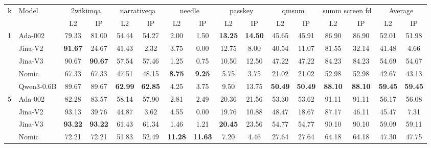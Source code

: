 \begin{sidewaystable}[htbp!]
\centering
\footnotesize
{}
\label{tab:detailed_mrr}
\begin{tabular}{llcccccccccccccc}
\toprule
\multirow{2}{*}{k} & \multirow{2}{*}{Model} & \multicolumn{2}{c}{2wikimqa} & \multicolumn{2}{c}{narrativeqa} & \multicolumn{2}{c}{needle} & \multicolumn{2}{c}{passkey} & \multicolumn{2}{c}{qmsum} & \multicolumn{2}{c}{summ screen fd} & \multicolumn{2}{c}{Average} \\
\cmidrule(lr){3-4} \cmidrule(lr){5-6} \cmidrule(lr){7-8} \cmidrule(lr){9-10} \cmidrule(lr){11-12} \cmidrule(lr){13-14} \cmidrule(lr){15-16}
& & L2 & IP & L2 & IP & L2 & IP & L2 & IP & L2 & IP & L2 & IP & L2 & IP \\
\midrule
\multirow{5}{*}{1} & Ada-002 & 79.33 & 81.00 & 54.44 & 54.27 & 2.00 & 1.50 & \textbf{13.25} & \textbf{14.50} & 45.65 & 45.91 & 86.90 & 86.90 & 52.01 & 51.98 \\
& Jina-V2 & \textbf{91.67} & 24.67 & 41.43 & 2.32 & 3.75 & 0.00 & 12.75 & 8.00 & 40.54 & 11.07 & 81.55 & 32.14 & 41.48 & 4.66 \\
& Jina-V3 & 90.67 & \textbf{90.67} & 57.54 & 57.46 & 1.25 & 0.75 & 10.50 & 12.50 & 47.22 & 47.22 & 84.23 & 84.23 & 54.69 & 54.67 \\
& Nomic & 67.33 & 67.33 & 47.51 & 48.15 & \textbf{8.75} & \textbf{9.25} & 5.75 & 3.75 & 21.02 & 21.02 & 52.98 & 52.98 & 42.67 & 43.13 \\
& Qwen3-0.6B & 89.67 & 89.67 & \textbf{62.99} & \textbf{62.85} & 4.25 & 3.75 & 9.50 & 13.75 & \textbf{50.49} & \textbf{50.49} & \textbf{88.10} & \textbf{88.10} & \textbf{59.45} & \textbf{59.45} \\
\midrule
\multirow{5}{*}{5} & Ada-002 & 82.28 & 83.57 & 58.14 & 57.90 & 2.81 & 2.49 & 20.36 & 21.56 & 53.30 & 53.62 & 91.11 & 91.11 & 56.17 & 56.08 \\
& Jina-V2 & 93.13 & 39.76 & 44.87 & 3.62 & 4.55 & 0.00 & 19.76 & 10.88 & 48.47 & 18.67 & 87.17 & 46.11 & 45.47 & 7.31 \\
& Jina-V3 & \textbf{93.22} & \textbf{93.22} & 61.43 & 61.34 & 1.46 & 1.21 & \textbf{20.45} & 23.56 & 54.77 & 54.77 & 90.10 & 90.10 & 59.09 & 59.11 \\
& Nomic & 72.21 & 72.21 & 51.83 & 52.49 & \textbf{11.28} & \textbf{11.63} & 7.20 & 4.46 & 27.64 & 27.64 & 64.18 & 64.18 & 47.30 & 47.75 \\

\end{tabular}
\end{sidewaystable}
